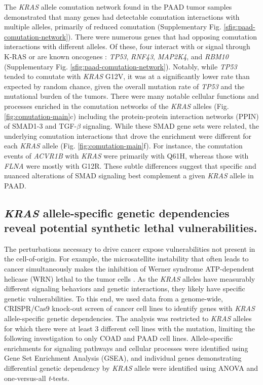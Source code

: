\documentclass[english, 10pt, letterpaper]{article}
\newcommand{\KRAS}{\emph{KRAS}}
\newcommand{\kras}{K-RAS}
\begin{document}
The \KRAS{} allele comutation network found in the PAAD tumor samples demonstrated that many genes had detectable comutation interactions with multiple alleles, primarily of reduced comutation (Supplementary Fig. \ref{sfig:paad-comutation-network}).
There were numerous genes that had opposing comutation interactions with different alleles.
Of these, four interact with or signal through \kras{} \cite{Kovalski2019, Kanehisa2017, Kanehisa2016KEGGAnnotation.} or are known oncogenes \cite{Bamford2004TheWebsite., Sondka2018}: \emph{TP53}, \emph{RNF43}, \emph{MAP2K4}, and \emph{RBM10} (Supplementary Fig. \ref{sfig:paad-comutation-network}).
Notably, while \emph{TP53} tended to comutate with \KRAS{} G12V, it was at a significantly lower rate than expected by random chance, given the overall mutation rate of \emph{TP53} and the mutational burden of the tumors.
There were many notable cellular functions and processes enriched in the comutation networks of the \KRAS{} alleles (Fig. \ref{fig:comutation-main}c) including the protein-protein interaction networks (PPIN) of SMAD1-3 and TGF-$\beta$ signaling.
While these SMAD gene sets were related, the underlying comutation interactions that drove the enrichment were different for each \KRAS{} allele (Fig. \ref{fig:comutation-main}f).
For instance, the comutation events of \emph{ACVR1B} with \KRAS{} were primarily with Q61H, whereas those with \emph{FLNA} were mostly with G12R.
These subtle differences suggest that specific and nuanced alterations of SMAD signaling best complement a given \KRAS{} allele in PAAD.


\subsection*{\KRAS{} allele-specific genetic dependencies reveal potential synthetic lethal vulnerabilities.}

The perturbations necessary to drive cancer expose vulnerabilities not present in the cell-of-origin.
For example, the microsatellite instability that often leads to cancer simultaneously makes the inhibition of Werner syndrome ATP-dependent helicase (WRN) lethal to the tumor cells \cite{Behan2019, Chan2019}.
As the \KRAS{} alleles have measurably different signaling behaviors and genetic interactions, they likely have specific genetic vulnerabilities.
To this end, we used data from a genome-wide, CRISPR/Cas9 knock-out screen of cancer cell lines \cite{Tsherniak2017, Meyers2017} to identify genes with \KRAS{} allele-specific genetic dependencies.
The analysis was restricted to \KRAS{} alleles for which there were at least 3 different cell lines with the mutation, limiting the following investigation to only COAD and PAAD cell lines.
Allele-specific enrichments for signaling pathways and cellular processes were identified using Gene Set Enrichment Analysis (GSEA), and individual genes demonstrating differential genetic dependency by \KRAS{} allele were identified using ANOVA and one-versus-all \emph{t}-tests.
\end{document}
